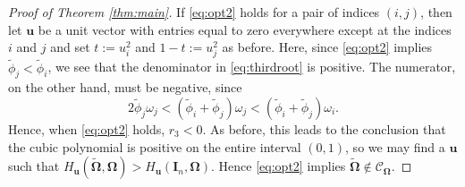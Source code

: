 \documentclass[12pt]{article}
\newcommand{\bl}[1]{{\mathbf #1}}
\newcommand{\bs}[1]{\boldsymbol #1}
\begin{document}
\begin{proof}[Proof of Theorem \ref{thm:main}]
If \eqref{eq:opt2} holds for a pair of indices $(i,j)$, then let $\bl{u}$ be a unit vector with entries equal to zero everywhere except at the indices $i$ and $j$ and set $t := u_i^2$ and $1-t := u_j^2$ as before. Here, since \eqref{eq:opt2} implies $\tilde{\phi}_j < \tilde{\phi}_i$, we see that the denominator in \eqref{eq:thirdroot} is positive. The numerator, on the other hand, must be negative, since
\begin{equation*}
    2 \tilde{\phi}_j \omega_j < (\tilde{\phi}_i + \tilde{\phi}_j) \omega_j < (\tilde{\phi}_i + \tilde{\phi}_j) \omega_i.
\end{equation*}
Hence, when \eqref{eq:opt2} holds, $r_3 < 0$. As before, this leads to the conclusion that the cubic polynomial is positive on the entire interval $(0, 1)$, so we may find a $\bl{u}$ such that $H_{\bl{u}}(\tilde{\bs{\Omega}}, \bs{\Omega}) > H_{\bl{u}}(\bl{I}_n, \bs{\Omega})$. Hence \eqref{eq:opt2} implies $\tilde{\bs{\Omega}} \notin \mathcal{C}_{\bs{\Omega}}$.


\end{proof}
\end{document}
